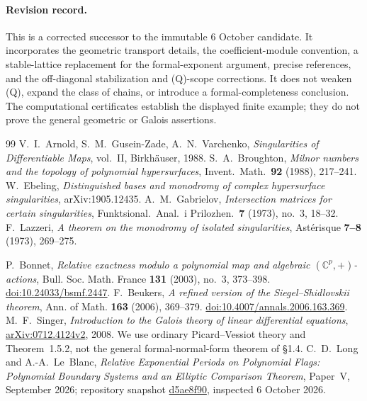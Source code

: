 \documentclass[11pt]{article}
\numberwithin{equation}{section}
\theoremstyle{definition}
\theoremstyle{remark}
\begin{document}
\paragraph{Revision record.} This is a corrected successor to the immutable
6 October candidate. It incorporates the geometric transport details,
the coefficient-module convention, a stable-lattice replacement for the
formal-exponent argument, precise references, and the off-diagonal
stabilization and (Q)-scope corrections. It does not weaken (Q), expand
the class of chains, or introduce a formal-completeness conclusion.
The computational certificates establish the displayed finite example;
they do not prove the general geometric or Galois assertions.

\begin{thebibliography}{99}
 V.~I.~Arnold, S.~M.~Gusein-Zade, A.~N.~Varchenko,
 \emph{Singularities of Differentiable Maps}, vol.~II, Birkh\"auser, 1988.
 S.~A.~Broughton, \emph{Milnor numbers and the topology of
 polynomial hypersurfaces}, Invent.\ Math.\ \textbf{92} (1988), 217--241.
 W.~Ebeling, \emph{Distinguished bases and monodromy of complex
 hypersurface singularities}, arXiv:1905.12435.
 A.~M.~Gabrielov, \emph{Intersection matrices for certain
 singularities}, Funktsional.\ Anal.\ i Prilozhen.\ \textbf{7} (1973), no.~3,
 18--32.
 F.~Lazzeri, \emph{A theorem on the monodromy of isolated
 singularities}, Ast\'erisque \textbf{7--8} (1973), 269--275.

 P.~Bonnet,
 \emph{Relative exactness modulo a polynomial map and algebraic
 $(\mathbb C^p,+)$-actions}, Bull. Soc. Math. France \textbf{131} (2003),
 no.~3, 373--398. \href{https://doi.org/10.24033/bsmf.2447}{doi:10.24033/bsmf.2447}.
 F.~Beukers,
 \emph{A refined version of the Siegel--Shidlovskii theorem}, Ann. of Math.
 \textbf{163} (2006), 369--379.
 \href{https://doi.org/10.4007/annals.2006.163.369}{doi:10.4007/annals.2006.163.369}.
 M.~F.~Singer,
 \emph{Introduction to the Galois theory of linear differential equations},
 \href{https://arxiv.org/abs/0712.4124}{arXiv:0712.4124v2}, 2008.
 We use ordinary Picard--Vessiot theory and Theorem~1.5.2, not the
 general formal-normal-form theorem of \S1.4.
 C.~D.~Long and A.-A.~Le~Blanc,
 \emph{Relative Exponential Periods on Polynomial Flags:
 Polynomial Boundary Systems and an Elliptic Comparison Theorem},
 Paper~V, September 2026; repository snapshot
 \href{https://github.com/long-mathematics/exponential-integral-theorem/tree/d5ae8f9081c7bc34d1622316bd8463482f244395}{d5ae8f90},
 inspected 6 October 2026.

\end{thebibliography}
\end{document}
